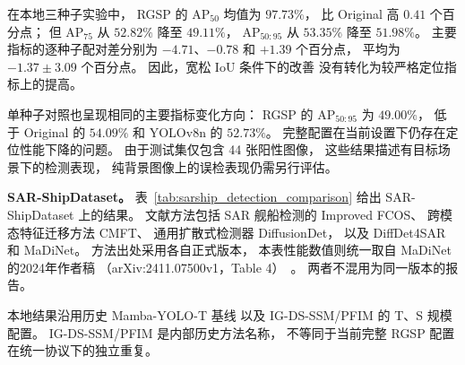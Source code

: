 在本地三种子实验中，
RGSP 的 AP$_{50}$ 均值为 $97.73\%$，
比 Original 高 $0.41$ 个百分点；
但 AP$_{75}$ 从 $52.82\%$ 降至 $49.11\%$，
AP$_{50:95}$ 从 $53.35\%$ 降至 $51.98\%$。
主要指标的逐种子配对差分别为
$-4.71$、$-0.78$ 和 $+1.39$ 个百分点，
平均为 $-1.37\pm3.09$ 个百分点。
因此，宽松 IoU 条件下的改善
没有转化为较严格定位指标上的提高。

单种子对照也呈现相同的主要指标变化方向：
RGSP 的 AP$_{50:95}$ 为 $49.00\%$，
低于 Original 的 $54.09\%$
和 YOLOv8n 的 $52.73\%$。
完整配置在当前设置下仍存在定位性能下降的问题。
由于测试集仅包含 44 张阳性图像，
这些结果描述有目标场景下的检测表现，
纯背景图像上的误检表现仍需另行评估。

\textbf{SAR-ShipDataset。}
表~\ref{tab:sarship_detection_comparison}
给出 SAR-ShipDataset 上的结果。
文献方法包括 SAR 舰船检测的 Improved FCOS、
跨模态特征迁移方法 CMFT、
通用扩散式检测器 DiffusionDet，
以及 DiffDet4SAR 和 MaDiNet。
方法出处采用各自正式版本，
本表性能数值则统一取自 MaDiNet 的2024年作者稿
（arXiv:2411.07500v1，Table 4）~\cite{madinet_preprint}。
两者不混用为同一版本的报告。

本地结果沿用历史 Mamba-YOLO-T 基线
以及 IG-DS-SSM/PFIM 的 T、S 规模配置。
IG-DS-SSM/PFIM 是内部历史方法名称，
不等同于当前完整 RGSP 配置在统一协议下的独立重复。


